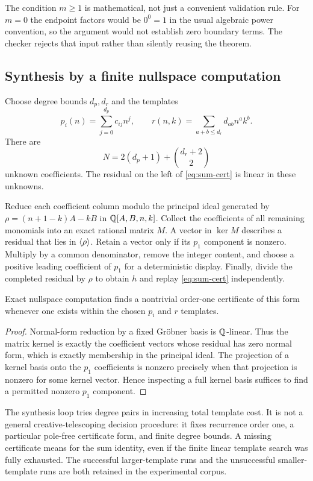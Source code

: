 The condition $m\ge1$ is mathematical, not just a convenient validation rule.
For $m=0$ the endpoint factors would be $0^0=1$ in the usual algebraic power
convention, so the argument would not establish zero boundary terms. The checker
rejects that input rather than silently reusing the theorem.

\subsection{Synthesis by a finite nullspace computation}

Choose degree bounds $d_p,d_r$ and the templates
\[
 p_i(n)=\sum_{j=0}^{d_p}c_{ij}n^j,\qquad
 r(n,k)=\sum_{a+b\le d_r}d_{ab}n^ak^b.
\]
There are
\[
 N=2(d_p+1)+\binom{d_r+2}{2}
\]
unknown coefficients. The residual on the left of \eqref{eq:sum-cert} is
linear in these unknowns.

Reduce each coefficient column modulo the principal ideal generated by
$\rho=(n+1-k)A-kB$ in $\mathbb Q[A,B,n,k]$. Collect the coefficients of all remaining
monomials into an exact rational matrix $M$. A vector in $\ker M$ describes a
residual that lies in $\left\langle \rho\right\rangle$. Retain a vector only if its $p_1$ component
is nonzero. Multiply by a common denominator, remove the integer content, and
choose a positive leading coefficient of $p_1$ for a deterministic display.
Finally, divide the completed residual by $\rho$ to obtain $h$ and replay
\eqref{eq:sum-cert} independently.

\begin{proposition}
Exact nullspace computation finds a nontrivial order-one certificate of this
form whenever one exists within the chosen $p_i$ and $r$ templates.
\end{proposition}
\begin{proof}
Normal-form reduction by a fixed Gr\"obner basis is $\mathbb Q$-linear. Thus the matrix
kernel is exactly the coefficient vectors whose residual has zero normal form,
which is exactly membership in the principal ideal. The projection of a kernel
basis onto the $p_1$ coefficients is nonzero precisely when that projection is
nonzero for some kernel vector. Hence inspecting a full kernel basis suffices
to find a permitted nonzero $p_1$ component.
\end{proof}

The synthesis loop tries degree pairs in increasing total template cost. It is
not a general creative-telescoping decision procedure: it fixes recurrence
order one, a particular pole-free certificate form, and finite degree bounds.
A missing certificate means \Unknown for the sum identity, even if the finite
linear template search was fully exhausted. The successful larger-template
runs and the unsuccessful smaller-template runs are both retained in the
experimental corpus.

